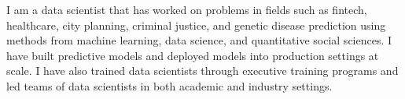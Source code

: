 

\begin{cvparagraph}
I am a data scientist that has worked on problems in fields such as fintech, healthcare, city planning, criminal justice,
and genetic disease prediction using methods from machine learning, data science, and quantitative social sciences.
I have built predictive models and deployed models into production settings at scale. I have also trained
data scientists through executive training programs and led teams of data scientists in both academic and industry settings.
\end{cvparagraph}
